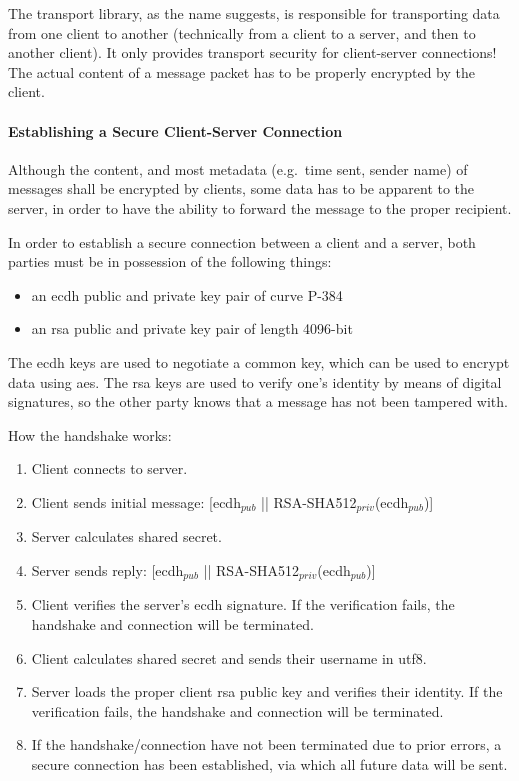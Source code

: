 The transport library, as the name suggests, is responsible for transporting data from one client to another
(technically from a client to a server, and then to another client).
It only provides transport security for client-server connections!
The actual content of a message packet has to be properly encrypted by the client.

\paragraph{Establishing a Secure Client-Server Connection}
Although the content, and most metadata (e.g.\ time sent, sender name) of messages shall be encrypted by clients, some
data has to be apparent to the server, in order to have the ability to forward the message to the proper recipient.

In order to establish a secure connection between a client and a server, both parties must be in possession of the
following things:

\begin{itemize}
  \setlength\itemsep{-.5em}
  \item an \ac{ecdh} public and private key pair of curve P-384~\cite{nist-digital-signature-standard}
  \item an \ac{rsa} public and private key pair of length 4096-bit
\end{itemize}

The \ac{ecdh} keys are used to negotiate a common key, which can be used to encrypt data using \ac{aes}.
The \ac{rsa} keys are used to verify one's identity by means of digital signatures, so the other party knows that a
message has not been tampered with.

How the handshake works:
\vspace{-.75em}
\begin{enumerate}
  \setlength\itemsep{-.5em}
  \item Client connects to server.
  \item Client sends initial message: [\ac{ecdh}$_{pub}$ || RSA-SHA512$_{priv}$(\ac{ecdh}$_{pub}$)]
  \item Server calculates shared secret.
  \item Server sends reply: [\ac{ecdh}$_{pub}$ || RSA-SHA512$_{priv}$(\ac{ecdh}$_{pub}$)]
  \item Client verifies the server's \ac{ecdh} signature.
    If the verification fails, the handshake and connection will be terminated.
  \item Client calculates shared secret and sends their username in \ac{utf8}.
  \item Server loads the proper client \ac{rsa} public key and verifies their identity.
    If the verification fails, the handshake and connection will be terminated.
  \item If the handshake/connection have not been terminated due to prior errors, a secure connection has been
    established, via which all future data will be sent.
\end{enumerate}

